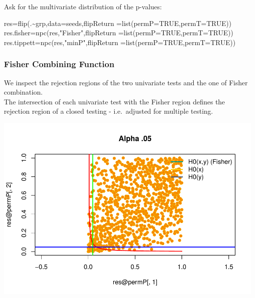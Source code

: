 \documentclass[
]{article}
\newenvironment{Shaded}{\begin{snugshade}}{\end{snugshade}}
\newcommand{\AttributeTok}[1]{\textcolor[rgb]{0.77,0.63,0.00}{#1}}
\newcommand{\ConstantTok}[1]{\textcolor[rgb]{0.00,0.00,0.00}{#1}}
\newcommand{\FunctionTok}[1]{\textcolor[rgb]{0.00,0.00,0.00}{#1}}
\newcommand{\NormalTok}[1]{#1}
\newcommand{\OtherTok}[1]{\textcolor[rgb]{0.56,0.35,0.01}{#1}}
\newcommand{\SpecialCharTok}[1]{\textcolor[rgb]{0.00,0.00,0.00}{#1}}
\newcommand{\StringTok}[1]{\textcolor[rgb]{0.31,0.60,0.02}{#1}}
\begin{document}
Ask for the multivariate distribution of the p-values:

\begin{Shaded}
\begin{Highlighting}[]
\NormalTok{res}\OtherTok{=}\FunctionTok{flip}\NormalTok{(.}\SpecialCharTok{\textasciitilde{}}\NormalTok{grp,}\AttributeTok{data=}\NormalTok{seeds,}\AttributeTok{flipReturn =}\FunctionTok{list}\NormalTok{(}\AttributeTok{permP=}\ConstantTok{TRUE}\NormalTok{,}\AttributeTok{permT=}\ConstantTok{TRUE}\NormalTok{))}
\NormalTok{res.fisher}\OtherTok{=}\FunctionTok{npc}\NormalTok{(res,}\StringTok{"Fisher"}\NormalTok{,}\AttributeTok{flipReturn =}\FunctionTok{list}\NormalTok{(}\AttributeTok{permP=}\ConstantTok{TRUE}\NormalTok{,}\AttributeTok{permT=}\ConstantTok{TRUE}\NormalTok{))}
\NormalTok{res.tippett}\OtherTok{=}\FunctionTok{npc}\NormalTok{(res,}\StringTok{"minP"}\NormalTok{,}\AttributeTok{flipReturn =}\FunctionTok{list}\NormalTok{(}\AttributeTok{permP=}\ConstantTok{TRUE}\NormalTok{,}\AttributeTok{permT=}\ConstantTok{TRUE}\NormalTok{))}
\end{Highlighting}
\end{Shaded}

\hypertarget{fisher-combining-function}{%
\subsubsection{Fisher Combining
Function}\label{fisher-combining-function}}

We inspect the rejection regions of the two univariate tests and the one
of Fisher combination.\\
The intersection of each univariate test with the Fisher region defines
the rejection region of a closed testing - i.e.~adjusted for multiple
testing.

\begin{center}\includegraphics{perm_files/figure-latex/unnamed-chunk-37-1} \end{center}
\end{document}
